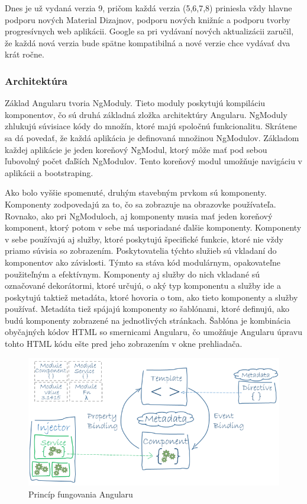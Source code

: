 \indent Dnes je už vydaná verzia 9, pričom každá verzia (5,6,7,8) priniesla vždy hlavne podporu nových Material Dizajnov, podporu nových knižníc a podporu tvorby progresívnych web aplikácii. Google sa pri vydávaní nových aktualizácii zaručil, že každá nová verzia bude spätne kompatibilná a nové verzie chce vydávať dva krát ročne\cite{bakalarska_praca,angular_1}.

\subsubsection{Architektúra}
\indent Základ Angularu tvoria NgModuly. Tieto moduly poskytujú kompiláciu komponentov, čo sú druhá základná zložka architektúry Angularu. NgModuly zhlukujú súvisiace kódy do množín, ktoré majú spoločnú funkcionalitu. Skrátene sa dá povedať, že každá aplikácia je definovaná množinou NgModulov. Základom každej aplikácie je jeden koreňový NgModul, ktorý môže mať pod sebou ľubovolný počet ďaľších NgModulov. Tento koreňový modul umožňuje navigáciu v aplikácii a bootstraping. 

\indent Ako bolo vyššie spomenuté, druhým stavebným prvkom sú komponenty. Komponenty zodpovedajú za to, čo sa zobrazuje na obrazovke používateľa. Rovnako, ako pri NgModuloch, aj komponenty musia mať jeden koreňový komponent, ktorý potom v sebe má usporiadané ďalšie komponenty. Komponenty v sebe používajú aj služby, ktoré poskytujú špecifické funkcie, ktoré nie vždy priamo súvisia so zobrazením. Poskytovatelia týchto služieb sú vkladaní do komponentov ako závislosti. Týmto sa stáva kód modulárnym, opakovateľne použiteľným a efektívnym. Komponenty aj služby do nich vkladané sú označované dekorátormi, ktoré určujú, o aký typ komponentu a služby ide a poskytujú taktiež metadáta, ktoré hovoria o tom, ako tieto komponenty a služby používať. Metadáta tiež spájajú komponenty so šablónami, ktoré definujú, ako budú komponenty zobrazené na jednotlivých stránkach. Šablóna je kombinácia obyčajných kódov HTML so smernicami Angularu, čo umožňuje Angularu úpravu tohto HTML kódu ešte pred jeho zobrazením v okne prehliadača\cite{angular_3}. 

\begin{figure}[H]
    \centering
    \includegraphics[scale=0.5]{img/angular_architecture.png}
    \caption{Princíp fungovania Angularu\cite{angular_3}}
    \label{fig:angular_architecture}
\end{figure}

